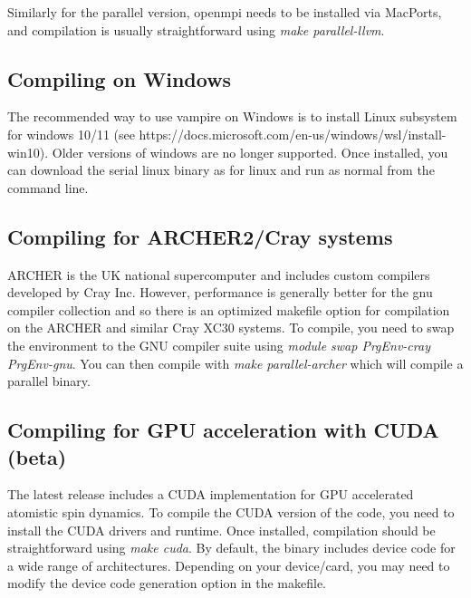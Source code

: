Similarly for the parallel version, openmpi needs to be installed via MacPorts,
and compilation is usually straightforward using \textit{make parallel-llvm}.

\subsection*{Compiling on Windows}
The recommended way to use vampire on Windows is to install Linux subsystem for
windows 10/11 (see https://docs.microsoft.com/en-us/windows/wsl/install-win10).
Older versions of windows are no longer supported. Once installed, you can
download the serial linux binary as for linux and run as normal from the
command line.



\subsection*{Compiling for ARCHER2/Cray systems}
ARCHER is the UK national supercomputer and includes custom compilers developed
by Cray Inc. However, performance is generally better for the gnu compiler
collection and so there is an optimized makefile option for compilation on the
ARCHER and similar Cray XC30 systems. To compile, you need to swap the
environment to the GNU compiler suite using
\textit{module swap PrgEnv-cray PrgEnv-gnu}. You can then compile with
\textit{make parallel-archer} which will compile a parallel binary.

\subsection*{Compiling for GPU acceleration with CUDA (beta)}
The latest release includes a CUDA implementation for GPU accelerated atomistic
spin dynamics. To compile the CUDA version of the code, you need to install
the CUDA drivers and runtime. Once installed, compilation should be
straightforward using \textit{make cuda}. By default, the binary
includes device code for a wide range of architectures. Depending on your
device/card, you may need to modify the device code generation option in the
makefile.

